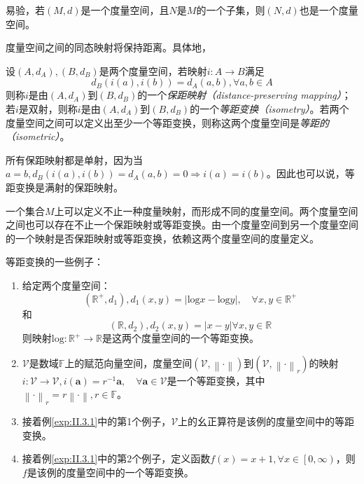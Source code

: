 \documentclass[../main.tex]{subfiles}
\begin{document}
易验，若$\left(M,d\right)$是一个度量空间，且$N$是$M$的一个子集，则$\left(N,d\right)$也是一个度量空间。

度量空间之间的同态映射将保持距离。具体地，

\begin{definition}[等距变换]\label{def:II.3.2}
    设$\left(A,d_A\right),\left(B,d_B\right)$是两个度量空间，若映射$i:A\rightarrow B$满足
    \[d_B\left(i\left(a\right),i\left(b\right)\right)=d_A\left(a,b\right),\forall a,b\in A\]
    则称$i$是由$\left(A,d_A\right)$到$\left(B,d_B\right)$的一个\emph{保距映射（distance-preserving mapping）}；若$i$是双射，则称$i$是由$\left(A,d_A\right)$到$\left(B,d_B\right)$的一个\emph{等距变换（isometry）}。若两个度量空间之间可以定义出至少一个等距变换，则称这两个度量空间是\emph{等距的（isometric）}。
\end{definition}

所有保距映射都是单射，因为当$a=b,d_B\left(i\left(a\right),i\left(b\right)\right)=d_A\left(a,b\right)=0\Rightarrow i\left(a\right)=i\left(b\right)$。因此也可以说，等距变换是满射的保距映射。

一个集合$M$上可以定义不止一种度量映射，而形成不同的度量空间。两个度量空间之间也可以存在不止一个保距映射或等距变换。由一个度量空间到另一个度量空间的一个映射是否保距映射或等距变换，依赖这两个度量空间的度量定义。

\begin{example}\label{exp:II.3.2}
    等距变换的一些例子：
    \begin{enumerate}
        \item 给定两个度量空间：
              \[\left(\mathbb{R}^+,d_1\right),d_1\left(x,y\right)=\left|\mathrm{log}x-\mathrm{log}y\right|,\quad\forall x,y\in\mathbb{R}^+\]
              和
              \[\left(\mathbb{R},d_2\right),d_2\left(x,y\right)=\left|x-y\right|\forall x,y\in\mathbb{R}\]
              则映射$\mathrm{log}:\mathbb{R}^+\rightarrow\mathbb{R}$是这两个度量空间的一个等距变换。
        \item $\mathcal{V}$是数域$\mathbb{F}$上的赋范向量空间，度量空间$\left(\mathcal{V},\left\|\cdot\right\|\right)$到$\left(\mathcal{V},\left\|\cdot\right\|_r\right)$的映射$i:\mathcal{V}\rightarrow\mathcal{V},i\left(\mathbf{a}\right)=r^{-1}\mathbf{a},\quad\forall\mathbf{a}\in\mathcal{V}$是一个等距变换，其中$\left\|\cdot\right\|_r=r\left\|\cdot\right\|,r\in\mathbb{F}$。
        \item 接着例\ref{exp:II.3.1}中的第1个例子，$\mathcal{V}$上的幺正算符是该例的度量空间中的等距变换。
        \item 接着例\ref{exp:II.3.1}中的第2个例子，定义函数$f\left(x\right)=x+1,\forall x\in\left[0,\infty\right)$，则$f$是该例的度量空间中的一个等距变换。
    \end{enumerate}
\end{example}
\end{document}
